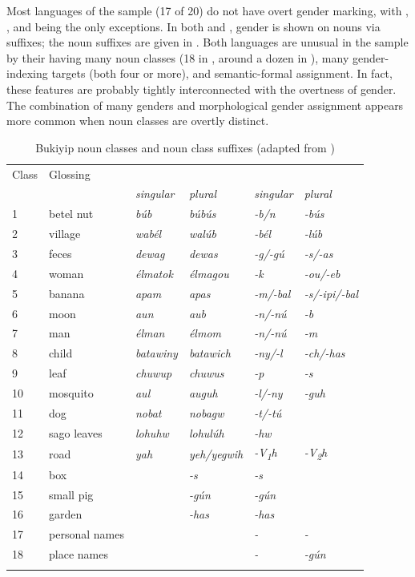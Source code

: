 \documentclass[output=collectionpaper]{langsci/langscibook}
\begin{document}
Most languages of the sample (17 of 20) do not have overt gender marking, with , , and  being the only exceptions. In both  and , gender is shown on nouns via suffixes; the  noun suffixes are given in . Both languages are unusual in the sample by their having many noun classes (18 in , around a dozen in ), many gender-indexing targets (both four or more), and semantic-formal assignment. In fact, these features are probably tightly interconnected with the overtness of gender. The combination of many genders and morphological gender assignment appears more common when noun classes are overtly distinct.


\begin{table}
\small
\begin{tabularx}{.9\textwidth}{lX>{\itshape}l>{\itshape}l>{\itshape}l>{\itshape}l}
\lsptoprule
Class &  Glossing & \multicolumn{2}{c}{\normalfont Example} & \multicolumn{2}{c}{\normalfont Noun suffix}\\
&  &\normalfont  singular &\normalfont  plural &\normalfont  singular &\normalfont  plural\\
\midrule
1 & betel nut & búb & búbús & {}-b/n & -bús\\
2 & village & wabél & walúb & {}-bél & -lúb\\
3 & feces & dewag & dewas & {}-g/-gú & -s/-as  \\
4 & woman & élmatok & élmagou & {}-k &  -ou/-eb\\
5 & banana & apam & apas & {}-m/-bal &  -s/-ipi/-bal\\
6 & moon & aun & aub & {}-n/-nú &  -b\\
7 & man & élman & élmom & {}-n/-nú & -m \\
8 & child & batawiny & batawich & {}-ny/-l & -ch/-has \\
9 & leaf & chuwup & chuwus & {}-p &  -s\\
10 & mosquito & aul & auguh & {}-l/-ny &  -guh\\
11 & dog & nobat & nobagw & {}-t/-tú &  \\
12 & sago leaves & lohuhw & lohulúh & {}-hw &  \\
13 & road & yah & yeh/yegwih & {}-{\normalfont V\textsubscript{1}}h & -{\normalfont V\textsubscript{2}}h  \\
14 & box & \multicolumn{2}{c}{\itshape kes} & {}-s &  -s\\
15 & small pig & \multicolumn{2}{c}{\itshape buligún} & {}-gún &  -gún\\
16 & garden & \multicolumn{2}{c}{\itshape yawihas} & {}-has &  -has\\
17 & personal names &  &  & {}- &  -\\
18 & place names &  &  & {}- &  -gún\\
\lspbottomrule
\end{tabularx}

\caption{Bukiyip noun classes and noun class suffixes (adapted from \citealt[10]{Conrad1991})}
\label{tab:Svard:11}
\end{table}
\end{document}
